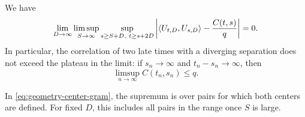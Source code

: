 \begin{proposition}
\label{prop:geometry-center-gram}
We have
\begin{equation}
 \lim_{D\to\infty}\limsup_{S\to\infty}
 \sup_{s\ge S+D,\ t\ge s+2D}
 \left|\left\langle U_{t,D},U_{s,D}\right\rangle-\frac{C(t,s)}q\right|=0 .
 \label{eq:geometry-center-gram}
\end{equation}
In particular, the correlation of two late times with a diverging separation does not exceed the plateau in the limit: if $s_n\to\infty$ and $t_n-s_n\to\infty$, then
\begin{equation}\label{eq:geometry-remote-envelope}
 \limsup_{n\to\infty}C(t_n,s_n)\le q .
\end{equation}
\end{proposition}

In \eqref{eq:geometry-center-gram}, the supremum is over pairs for which both centers are defined. For fixed $D$, this includes all pairs in the range once $S$ is large.

